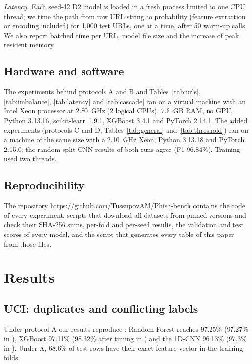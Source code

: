 \documentclass[conference]{IEEEtran}
\begin{document}
\emph{Latency.} Each seed-42 D2 model is loaded in a fresh process limited to one CPU thread; we time the path from raw URL string to probability (feature extraction or encoding included) for 1,000 test URLs, one at a time, after 50 warm-up calls. We also report batched time per URL, model file size and the increase of peak resident memory.

\subsection{Hardware and software}

The experiments behind protocols A and B and Tables~\ref{tab:urls}, \ref{tab:imbalance}, \ref{tab:latency} and \ref{tab:cascade} ran on a virtual machine with an Intel Xeon processor at 2.80~GHz (2 logical CPUs), 7.8~GB RAM, no GPU, Python 3.13.16, scikit-learn 1.9.1, XGBoost 3.4.1 and PyTorch 2.14.1. The added experiments (protocols C and D, Tables~\ref{tab:general} and~\ref{tab:threshold}) ran on a machine of the same size with a 2.10~GHz Xeon, Python 3.13.18 and PyTorch 2.15.0; the random-split CNN results of both runs agree (F1 96.84\%). Training used two threads.

\subsection{Reproducibility}\label{sec:repro}

The repository \url{https://github.com/TussupovAM/Phish-bench} contains the code of every experiment, scripts that download all datasets from pinned versions and check their SHA-256 sums, per-fold and per-seed results, the validation and test scores of every model, and the script that generates every table of this paper from those files.

\section{Results}\label{sec:results}

\subsection{UCI: duplicates and conflicting labels}

Under protocol A our results reproduce \cite{shahrivari2020}: Random Forest reaches 97.25\% (97.27\% in \cite{shahrivari2020}), XGBoost 97.11\% (98.32\% after tuning in \cite{shahrivari2020}) and the 1D-CNN 96.13\% (97.3\% in \cite{yerima2020}). Under A, 68.6\% of test rows have their exact feature vector in the training folds.
\end{document}
